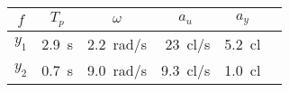 \documentclass[../main.tex]{subfiles}
\begin{document}
\begin{table}[H]
    \centering
    \begin{tabular}{@{}rrrrrr@{}}
        \toprule
        \multicolumn{1}{c}{$f$} & \multicolumn{1}{c}{$T_p$} & \multicolumn{1}{c}{$\omega$} & \multicolumn{1}{c}{$a_u$} & \multicolumn{1}{c}{$a_y$} & \\ \midrule
        $y_1$                   & \SI{2.9}{s}               & \SI{2.2}{rad/s}              & \SI{23}{cl/s}             & \SI{5.2}{cl}                \\
        $y_2$                   & \SI{0.7}{s}               & \SI{9.0}{rad/s}              & \SI{9.3}{cl/s}            & \SI{1.0}{cl}                \\ \bottomrule
    \end{tabular}
    \caption{}
    \label{tab:kap1_sinus}
\end{table}
\end{document}
